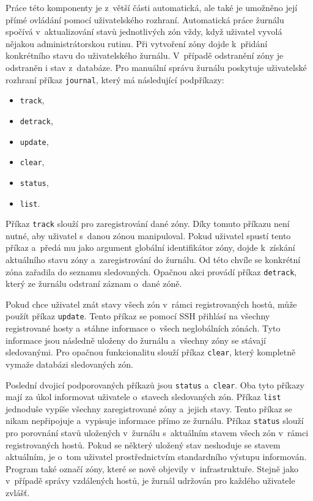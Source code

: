 Práce této komponenty je z~větší části automatická, ale také je umožněno její přímé ovládání pomocí uživatelského rozhraní. Automatická
práce žurnálu spočívá v~aktualizování stavů jednotlivých zón vždy, když uživatel vyvolá nějakou administrátorskou rutinu. Při vytvoření
zóny dojde k~přidání konkrétního stavu do uživatelského žurnálu. V~případě odstranění zóny je odstraněn i stav z~databáze. Pro 
manuální správu žurnálu poskytuje uživatelské rozhraní příkaz \verb|journal|, který má následující podpříkazy:
\begin{itemize}
 \item \verb|track|,
 \item \verb|detrack|,
 \item \verb|update|,
 \item \verb|clear|,
 \item \verb|status|,
 \item \verb|list|.
\end{itemize}
Příkaz \verb|track| slouží pro zaregistrování dané zóny. Díky tomuto příkazu není nutné, aby uživatel s~danou zónou manipuloval.
Pokud uživatel spustí tento příkaz a~předá mu jako argument globální identifikátor zóny, dojde k~získání aktuálního stavu zóny
a~zaregistrování do žurnálu. Od této chvíle se konkrétní zóna zařadila do seznamu sledovaných. Opačnou akci provádí příkaz
\verb|detrack|, který ze žurnálu odstraní záznam o~dané zóně.

Pokud chce uživatel znát stavy všech zón v~rámci registrovaných hostů, může použít příkaz \verb|update|. Tento příkaz se pomocí
SSH přihlásí na všechny registrované hosty a~stáhne informace o~všech neglobálních zónách.  Tyto informace jsou následně uloženy
do žurnálu a~všechny zóny se stávají sledovanými. Pro opačnou funkcionalitu slouží příkaz \verb|clear|, který kompletně vymaže
databázi sledovaných zón.

Poslední dvojicí podporovaných příkazů jsou \verb|status| a~\verb|clear|. Oba tyto příkazy mají za úkol informovat uživatele
o~stavech sledovaných zón. Příkaz \verb|list| jednoduše vypíše všechny zaregistrované zóny a~jejich stavy. Tento příkaz se nikam
nepřipojuje a~vypisuje informace přímo ze žurnálu. Příkaz \verb|status| slouží pro porovnání stavů uložených v~žurnálu
s~aktuálním stavem všech zón v~rámci registrovaných hostů. Pokud se některý uložený stav neshoduje se stavem aktuálním, je 
o~tom uživatel prostřednictvím standardního výstupu informován. Program také označí zóny, které se nově objevily v~infrastruktuře. 
Stejně jako v~případě správy vzdálených hostů, je žurnál udržován pro každého uživatele zvlášť. 
